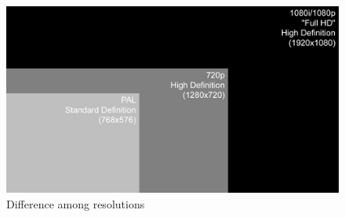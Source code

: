 \documentclass[english]{article}
\begin{document}
\begin{figure}
\centerline{\includegraphics[scale=1]{DTV/Pic2}}
\caption{Difference among resolutions}
\end{figure}
\end{document}

